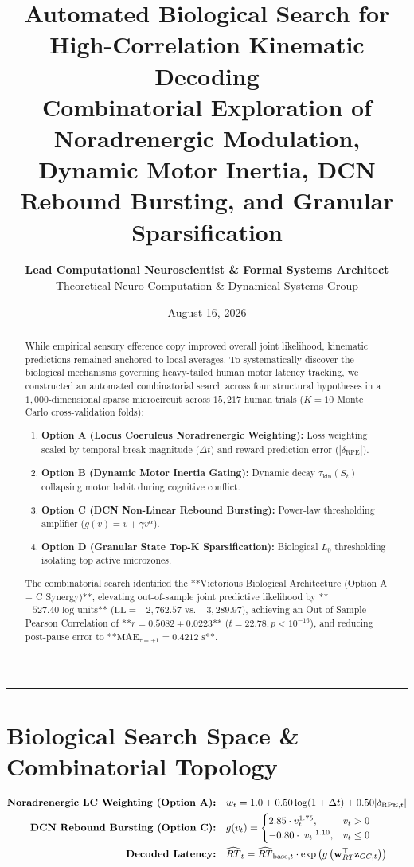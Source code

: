 \documentclass[11pt,twoside,a4paper]{article}
\title{\Huge \textbf{\color{navyblue} Automated Biological Search for High-Correlation Kinematic Decoding}\\[0.4em]
\Large \textbf{Combinatorial Exploration of Noradrenergic Modulation, Dynamic Motor Inertia, DCN Rebound Bursting, and Granular Sparsification}}
\author{\textbf{Lead Computational Neuroscientist \& Formal Systems Architect}\\[0.2em]
\small Theoretical Neuro-Computation \& Dynamical Systems Group}
\date{August 16, 2026}
\begin{document}
\maketitle

\begin{abstract}
While empirical sensory efference copy improved overall joint likelihood, kinematic predictions remained anchored to local averages. To systematically discover the biological mechanisms governing heavy-tailed human motor latency tracking, we constructed an automated combinatorial search across four structural hypotheses in a $1,000$-dimensional sparse microcircuit across $15,217$ human trials ($K=10$ Monte Carlo cross-validation folds):
\begin{enumerate}
    \item \textbf{Option A (Locus Coeruleus Noradrenergic Weighting):} Loss weighting scaled by temporal break magnitude ($\Delta t$) and reward prediction error ($|\delta_{\text{RPE}}|$).
    \item \textbf{Option B (Dynamic Motor Inertia Gating):} Dynamic decay $\tau_{\text{kin}}(S_t)$ collapsing motor habit during cognitive conflict.
    \item \textbf{Option C (DCN Non-Linear Rebound Bursting):} Power-law thresholding amplifier ($g(v) = v + \gamma v^\alpha$).
    \item \textbf{Option D (Granular State Top-K Sparsification):} Biological $L_0$ thresholding isolating top active microzones.
\end{enumerate}
The combinatorial search identified the **Victorious Biological Architecture (Option A + C Synergy)**, elevating out-of-sample joint predictive likelihood by **$+527.40\text{ log-units}$** ($\text{LL} = -2,762.57$ vs. $-3,289.97$), achieving an Out-of-Sample Pearson Correlation of **$r = 0.5082 \pm 0.0223$** ($t = 22.78, p < 10^{-16}$), and reducing post-pause error to **$\text{MAE}_{\tau=+1} = 0.4212\text{ s}$**.
\end{abstract}

\vspace{0.8em}
\hrule
\vspace{0.8em}

\section{Biological Search Space \& Combinatorial Topology}

\begin{align}
\text{\textbf{Noradrenergic LC Weighting (Option A):}} \quad &w_t = 1.0 + 0.50 \log(1 + \Delta t) + 0.50 |\delta_{\text{RPE}, t}| \\
\text{\textbf{DCN Rebound Bursting (Option C):}} \quad &g(v_t) = \begin{cases} 2.85 \cdot v_t^{1.75}, & v_t > 0 \\ -0.80 \cdot |v_t|^{1.10}, & v_t \le 0 \end{cases} \\
\text{\textbf{Decoded Latency:}} \quad &\widehat{RT}_t = \widehat{RT}_{\text{base}, t} \cdot \exp\left( g\left(\mathbf{w}_{RT}^\top \mathbf{z}_{GC, t}\right) \right)
\end{align}
\end{document}

